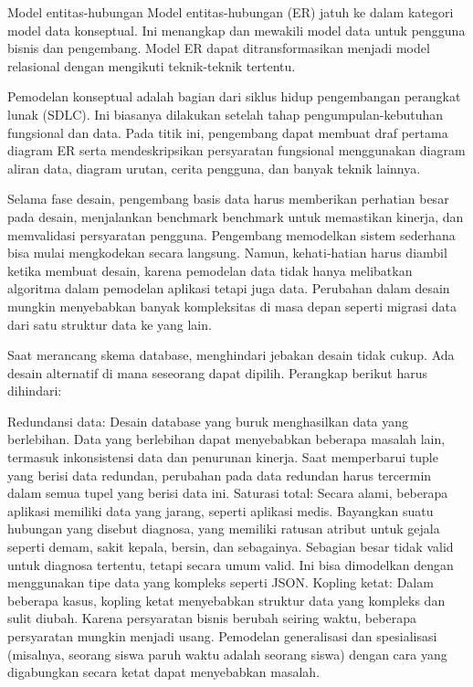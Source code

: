 \documentclass[]{book}
\begin{document}
Model entitas-hubungan Model entitas-hubungan (ER) jatuh ke dalam kategori model data konseptual. Ini menangkap dan mewakili model data untuk pengguna bisnis dan pengembang. Model ER dapat ditransformasikan menjadi model relasional dengan mengikuti teknik-teknik tertentu.

Pemodelan konseptual adalah bagian dari siklus hidup pengembangan perangkat lunak (SDLC). Ini biasanya dilakukan setelah tahap pengumpulan-kebutuhan fungsional dan data. Pada titik ini, pengembang dapat membuat draf pertama diagram ER serta mendeskripsikan persyaratan fungsional menggunakan diagram aliran data, diagram urutan, cerita pengguna, dan banyak teknik lainnya.

Selama fase desain, pengembang basis data harus memberikan perhatian besar pada desain, menjalankan benchmark benchmark untuk memastikan kinerja, dan memvalidasi persyaratan pengguna. Pengembang memodelkan sistem sederhana bisa mulai mengkodekan secara langsung. Namun, kehati-hatian harus diambil ketika membuat desain, karena pemodelan data tidak hanya melibatkan algoritma dalam pemodelan aplikasi tetapi juga data. Perubahan dalam desain mungkin menyebabkan banyak kompleksitas di masa depan seperti migrasi data dari satu struktur data ke yang lain.

Saat merancang skema database, menghindari jebakan desain tidak cukup. Ada desain alternatif di mana seseorang dapat dipilih. Perangkap berikut harus dihindari:

Redundansi data: Desain database yang buruk menghasilkan data yang berlebihan. Data yang berlebihan dapat menyebabkan beberapa masalah lain, termasuk inkonsistensi data dan penurunan kinerja. Saat memperbarui tuple yang berisi data redundan, perubahan pada data redundan harus tercermin dalam semua tupel yang berisi data ini. Saturasi total: Secara alami, beberapa aplikasi memiliki data yang jarang, seperti aplikasi medis. Bayangkan suatu hubungan yang disebut diagnosa, yang memiliki ratusan atribut untuk gejala seperti demam, sakit kepala, bersin, dan sebagainya. Sebagian besar tidak valid untuk diagnosa tertentu, tetapi secara umum valid. Ini bisa dimodelkan dengan menggunakan tipe data yang kompleks seperti JSON. Kopling ketat: Dalam beberapa kasus, kopling ketat menyebabkan struktur data yang kompleks dan sulit diubah. Karena persyaratan bisnis berubah seiring waktu, beberapa persyaratan mungkin menjadi usang. Pemodelan generalisasi dan spesialisasi (misalnya, seorang siswa paruh waktu adalah seorang siswa) dengan cara yang digabungkan secara ketat dapat menyebabkan masalah.
\end{document}
